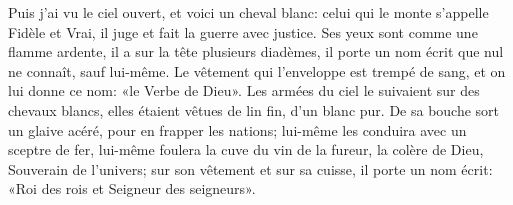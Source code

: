 Puis j’ai vu le ciel ouvert, et voici un cheval blanc:
	celui qui le monte s’appelle Fidèle et Vrai,
	il juge et fait la guerre avec justice.
Ses yeux sont comme une flamme ardente,
	il a sur la tête plusieurs diadèmes,
	il porte un nom écrit que nul ne connaît, sauf lui-même.
Le vêtement qui l’enveloppe est trempé de sang,
	et on lui donne ce nom: «le Verbe de Dieu».
Les armées du ciel le suivaient sur des chevaux blancs,
	elles étaient vêtues de lin fin, d’un blanc pur.
De sa bouche sort un glaive acéré, pour en frapper les nations;
	lui-même les conduira avec un sceptre de fer,
	lui-même foulera la cuve du vin de la fureur,
	la colère de Dieu, Souverain de l’univers;
	sur son vêtement et sur sa cuisse, il porte un nom écrit:
	«Roi des rois et Seigneur des seigneurs».
